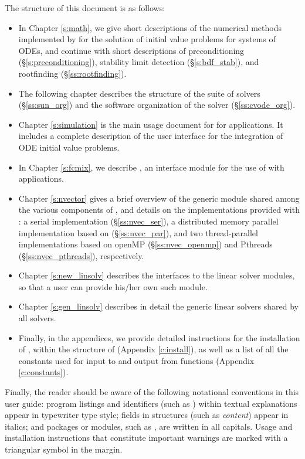 The structure of this document is as follows:
\begin{itemize}
\item
  In Chapter \ref{s:math}, we give short descriptions of the numerical
  methods implemented by {\cvode} for the solution of initial value
  problems for systems of ODEs, and continue with short descriptions of
  preconditioning (\S\ref{s:preconditioning}), stability limit detection
  (\S\ref{s:bdf_stab}), and rootfinding (\S\ref{ss:rootfinding}).
\item
  The following chapter describes the structure of the {\sundials} suite
  of solvers (\S\ref{ss:sun_org}) and the software organization of the {\cvode}
  solver (\S\ref{ss:cvode_org}). 
\item
  Chapter \ref{s:simulation} is the main usage document for {\cvode} for
  {\CC} applications.  It includes a complete description of the user interface
  for the integration of ODE initial value problems.
\item
  In Chapter \ref{s:fcmix}, we describe {\fcvode}, an interface module
  for the use of {\cvode} with {\F} applications.
\item
  Chapter \ref{s:nvector} gives a brief overview of the generic
  {\nvector} module shared among the various components of
  {\sundials}, and details on the {\nvector} implementations
  provided with {\sundials}: 
  a serial implementation
  (\S\ref{ss:nvec_ser}), a distributed memory parallel implementation 
  based on {\mpi} 
  (\S\ref{ss:nvec_par}), and two thread-parallel implementations 
  based on openMP  (\S\ref{ss:nvec_openmp}) 
  and Pthreads  (\S\ref{ss:nvec_pthreads}), respectively.
\item
  Chapter \ref{s:new_linsolv} describes the interfaces to the linear
  solver modules, so that a user can provide his/her own such module.
\item
  Chapter \ref{s:gen_linsolv} describes in detail the generic linear
  solvers shared by all {\sundials} solvers.
\item
  Finally, in the appendices, we provide detailed instructions for the installation
  of {\cvode}, within the structure of {\sundials} (Appendix \ref{c:install}), as well
  as a list of all the constants used for input to and output from {\cvode} functions
  (Appendix \ref{c:constants}).
\end{itemize}

Finally, the reader should be aware of the following notational conventions
in this user guide:  program listings and identifiers (such as ) 
within textual explanations appear in typewriter type style; 
fields in {\CC} structures (such as {\em content}) appear in italics;
and packages or modules, such as {\cvdense}, are written in all capitals. 
Usage and installation instructions that constitute important warnings
are marked with a triangular symbol {\warn} in the margin.

